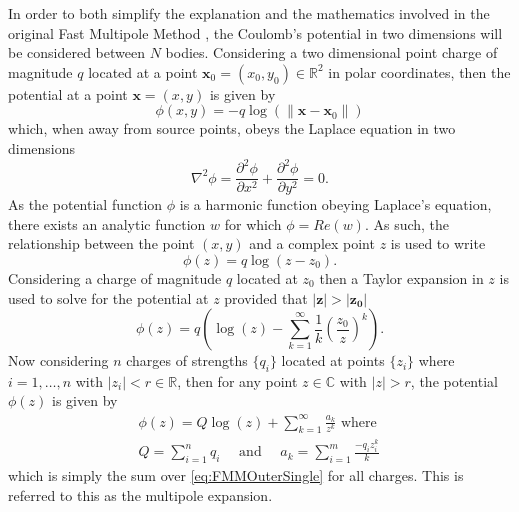 In order to both simplify the explanation and the mathematics involved in the original Fast Multipole Method \cite{Greengard1987ASimulations}, the Coulomb's potential in two dimensions will be considered between $N$ bodies. Considering a two dimensional point charge of magnitude $q$ located at a point $\bm{x}_0 = (x_0,y_0) \in \mathbb{R}^2$ in polar coordinates, then the potential at a point $\bm{x} = (x,y)$ is given by
\begin{equation*}
    \phi(x,y) = -q\log(\lVert \bm{x} - \bm{x}_0 \rVert)
\end{equation*}
which, when away from source points, obeys the Laplace equation in two dimensions
\begin{equation*}
    \nabla^2 \phi = \frac{\partial^2 \phi}{\partial x^2} + \frac{\partial^2 \phi}{\partial y^2} = 0.
\end{equation*}
As the potential function $\phi$ is a harmonic function obeying Laplace's equation, there exists an analytic function $w$ for which $\phi = Re(w)$. As such, the relationship between the point $(x,y)$ and a complex point $z$ is used to write
\begin{equation*}
    \phi(z) = q\log(z-z_0).
\end{equation*}
Considering a charge of magnitude $q$ located at $z_0$ then a Taylor expansion in $z$ is used to  solve for the potential at $z$ provided that $|\bm{z}|>|\bm{z_0}|$
\begin{equation}
\label{eq:FMMOuterSingle}
    \phi(z) = q\left( \log(z) - \sum_{k=1}^{\infty} \frac{1}{k}\left( \frac{z_0}{z} \right)^k \right).
\end{equation}
Now considering $n$ charges of strengths $\{q_i\}$ located at points $\{z_i\}$ where $i=1,\dots,n$ with $|z_i|<r\in\mathbb{R}$, then for any point $z\in\mathbb{C}$ with $|z|>r$, the potential $\phi(z)$ is given by
\begin{equation}
\label{eq:FMMOuterMulti}
\begin{gathered}
    \phi(z) = Q\log(z) + \sum_{k=1}^\infty \frac{a_k}{z^k} \text{ where }\\
    Q = \sum_{i=1}^n q_i \quad \text{ and } \quad a_k = \sum_{i=1}^{m} \frac{-q_i z_i^k}{k}
\end{gathered}
\end{equation}
which is simply the sum over \cref{eq:FMMOuterSingle} for all charges. This is referred to this as the multipole expansion. 

